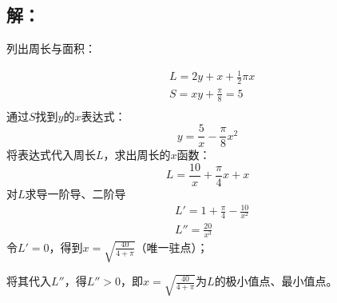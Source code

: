 \documentclass[UTF8]{ctexart}
\begin{document}
\begin{figure}[H]
    \centering
\end{figure}

\subsection*{解：}

列出周长与面积：

\begin{align*}
    &L=2y+x+ \frac{1}{2} \pi x \\
    &S=xy+ \frac{ \pi }{8}=5 \\
\end{align*}
通过$S$找到$y$的$x$表达式：
\begin{equation}
    y = \frac{5}{x}- \frac{\pi}{8} x^{2}
\end{equation}
将表达式代入周长$L$，求出周长的$x$函数：
\begin{equation}
    L= \frac{10}{x} + \frac{\pi}{4} x+x
\end{equation}
对$L$求导一阶导、二阶导
\begin{align*}
    &L'= 1+ \frac{\pi}{4} - \frac{10}{x^{2}} \\
    &L'' = \frac{20}{x^{3}}
\end{align*}
令$L'=0$，得到$x=\sqrt{\frac{40}{4+\pi}}$（唯一驻点）；

将其代入$L''$，得$L''>0$，即$x=\sqrt{\frac{40}{4+\pi}}$为$L$的极小值点、最小值点。
\\
\end{document}
